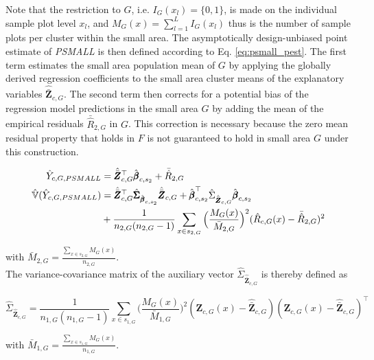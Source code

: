 Note that the restriction to $G$, i.e. $I_{G}(x_l)=\{0,1\}$, is made on the individual sample plot level $x_l$, and $M_{G}(x) = \sum_{l=1}^{L}I_{G}(x_l)$ thus is the number of sample plots per cluster within the small area. The asymptotically design-unbiased point estimate of \textit{PSMALL} is then defined according to Eq. \ref{eq:psmall_pest}. The first term estimates the small area population mean of $G$ by applying the globally derived regression coefficients to the small area cluster means of the explanatory variables $\hat{\bar{\pmb{Z}}}_{c,G}$. The second term then corrects for a potential bias of the regression model predictions in the small area $G$ by adding the mean of the empirical residuals $\bar{\hat{R}}_{2,G}$ in $G$. This correction is necessary because the zero mean residual property that holds in $F$ is not guaranteed to hold in small area $G$ under this construction.

\begin{subequations}\label{eq:psmall}
	\begin{align}
	\hat{Y}_{c,G,PSMALL} &= \hat{\bar{\pmb{Z}}}_{c,G}^{\top}\hat{\pmb{\beta}}_{c,s_2} + \bar{\hat{R}}_{2,G} \label{eq:psmall_pest} \\
	\hat{\mathbb{V}}(\hat{Y}_{c,G,PSMALL}) & = \hat{\bar{\pmb{Z}}}_{c,G}^{\top}\hat{\pmb{\Sigma}}_{\hat{\pmb{\beta}}_{c,s_2}}\hat{\bar{\pmb{Z}}}_{c,G}
	+ \hat{\pmb{\beta}}_{c,s_2}^{\top}\hat{\Sigma}_{\hat{\bar{\pmb{Z}}}_{c,G}}\hat{\pmb{\beta}}_{c,s_2} \nonumber \\
	& + \frac{1}{n_{2,G}(n_{2,G}-1)}\sum_{x \in s_{2,G}}\Big(\frac{M_{G}(x)}{\bar{M}_{2,G}}\Big)^2(\hat{R}_{c,G}(x) - \bar{\hat{R}}_{2,G})^2
	\label{eq:psmallvar}
	\end{align}
\end{subequations}

\noindent with $\bar{M}_{2,G}=\frac{\sum_{x \in s_{2,G}}M_{G}(x)}{n_{2,G}}$.\\

The variance-covariance matrix of the auxiliary vector $\hat{\Sigma}_{\hat{\bar{\pmb{Z}}}_{c,G}}$ is thereby defined as

\begin{equation}\label{estvarcovaux_G}
\hat{\Sigma}_{\hat{\bar{\pmb{Z}}}_{c,G}} = \frac{1}{n_{1,G}(n_{1,G}-1)} \sum_{x \in s_{1,G}} \big(\frac{M_{G}(x)}{\bar{M}_{1,G}}\big)^2 (\pmb{Z}_{c,G}(x)-\hat{\bar{\pmb{Z}}}_{c,G})(\pmb{Z}_{c,G}(x)-\hat{\bar{\pmb{Z}}}_{c,G})^{\top}
\end{equation}

\noindent with $\bar{M}_{1,G}=\frac{\sum_{x \in s_{1,G}}M_{G}(x)}{n_{1,G}}$.\\

